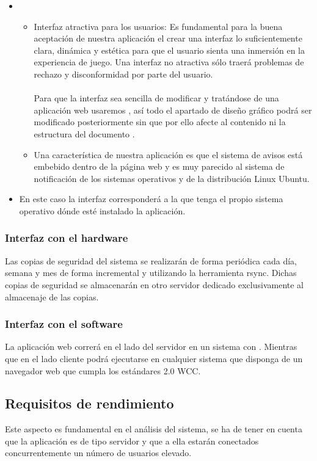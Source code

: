 \begin{itemize}
\item {}
  \begin{itemize}
  \item Interfaz atractiva para los usuarios: Es fundamental para la buena
    aceptación de nuestra aplicación el crear una interfaz lo suficientemente
    clara, dinámica y estética para que el usuario sienta una inmersión en la
    experiencia de juego. Una interfaz no atractiva sólo traerá problemas de
    rechazo y disconformidad por parte del usuario.\\\\
    Para que la interfaz sea sencilla de modificar y tratándose de una
    aplicación web usaremos , así todo el apartado
    de diseño gráfico podrá ser modificado posteriormente sin que por ello
    afecte al contenido ni la estructura del documento .
  \item Una característica de nuestra aplicación es que el sistema de avisos
    está embebido dentro de la página web y es muy parecido al sistema de
    notificación de los sistemas operativos  y de la \cursiva
    {distribución Linux Ubuntu}.
  \end{itemize}
\item {} En este caso la interfaz corresponderá a la que
  tenga el propio sistema operativo dónde esté instalado la aplicación.
\end{itemize}
\subsubsection{Interfaz con el hardware}
Las copias de seguridad del sistema se realizarán de forma periódica cada día, semana y mes de forma incremental y utilizando la herramienta rsync. Dichas copias de seguridad se almacenarán en otro
servidor dedicado exclusivamente al almacenaje de las copias.

\subsubsection{Interfaz con el software}
La aplicación web correrá en el lado del servidor en un sistema 
con . Mientras que en el lado cliente podrá
ejecutarse en cualquier sistema que disponga de un navegador web que cumpla los
estándares 2.0 WCC.

\subsection{Requisitos de rendimiento}
Este aspecto es fundamental en el análisis del sistema, se ha de tener en cuenta que la aplicación es de
tipo servidor y que a ella estarán conectados concurrentemente un número de
usuarios elevado.

